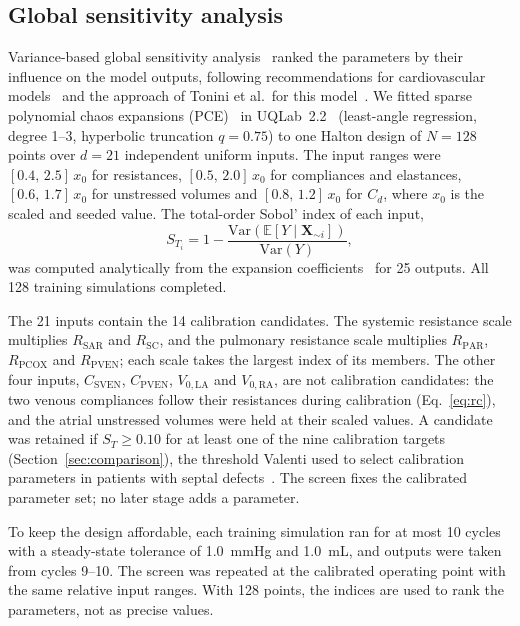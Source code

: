 \subsection{Global sensitivity analysis}
\label{sec:gsa}
Variance-based global sensitivity analysis~\cite{Sobol2001,Saltelli2010} ranked the parameters by their influence on the model outputs, following recommendations for cardiovascular models~\cite{Eck2016} and the approach of Tonini et al.\ for this model~\cite{Tonini2025}. We fitted sparse polynomial chaos expansions (PCE)~\cite{Blatman2011} in UQLab~2.2~\cite{Marelli2014} (least-angle regression, degree 1--3, hyperbolic truncation $q = 0.75$) to one Halton design of $N = 128$ points over $d = 21$ independent uniform inputs. The input ranges were $[0.4,\,2.5]\,x_0$ for resistances, $[0.5,\,2.0]\,x_0$ for compliances and elastances, $[0.6,\,1.7]\,x_0$ for unstressed volumes and $[0.8,\,1.2]\,x_0$ for $C_d$, where $x_0$ is the scaled and seeded value. The total-order Sobol' index of each input,
\begin{equation}
S_{T_i} = 1 - \frac{\mathrm{Var}\!\left(\mathbb{E}\left[Y \mid \mathbf{X}_{\sim i}\right]\right)}{\mathrm{Var}(Y)},
\label{eq:sobol}
\end{equation}
was computed analytically from the expansion coefficients~\cite{Sudret2008} for 25 outputs. All 128 training simulations completed.

The 21 inputs contain the 14 calibration candidates. The systemic resistance scale multiplies $R_{\mathrm{SAR}}$ and $R_{\mathrm{SC}}$, and the pulmonary resistance scale multiplies $R_{\mathrm{PAR}}$, $R_{\mathrm{PCOX}}$ and $R_{\mathrm{PVEN}}$; each scale takes the largest index of its members. The other four inputs, $C_{\mathrm{SVEN}}$, $C_{\mathrm{PVEN}}$, $V_{0,\mathrm{LA}}$ and $V_{0,\mathrm{RA}}$, are not calibration candidates: the two venous compliances follow their resistances during calibration (Eq.~\ref{eq:rc}), and the atrial unstressed volumes were held at their scaled values. A candidate was retained if $S_{T} \ge 0.10$ for at least one of the nine calibration targets (Section~\ref{sec:comparison}), the threshold Valenti used to select calibration parameters in patients with septal defects~\cite{Valenti2023}. The screen fixes the calibrated parameter set; no later stage adds a parameter.

To keep the design affordable, each training simulation ran for at most 10 cycles with a steady-state tolerance of 1.0~mmHg and 1.0~mL, and outputs were taken from cycles 9--10. The screen was repeated at the calibrated operating point with the same relative input ranges. With 128 points, the indices are used to rank the parameters, not as precise values.


